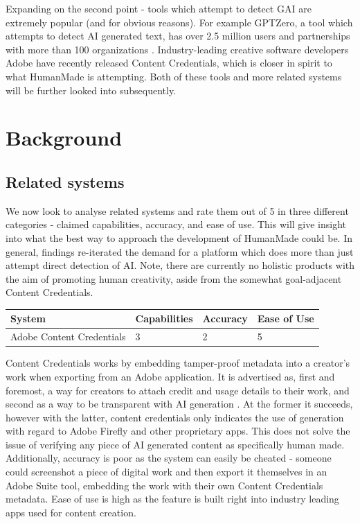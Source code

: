 \documentclass[12pt,a4paper]{article}
\begin{document}
\noindent Expanding on the second point - tools which attempt to detect GAI are extremely popular (and for obvious reasons). For example GPTZero, a tool which attempts to detect AI generated text, has over 2.5 million users and partnerships with more than 100 organizations \cite{gptzero}. Industry-leading creative software developers Adobe have recently released Content Credentials, which is closer in spirit to what HumanMade is attempting. Both of these tools and more related systems will be further looked into subsequently.
\section{Background}
\subsection{Related systems}
We now look to analyse related systems and rate them out of 5 in three different categories - claimed capabilities, accuracy, and ease of use. This will give insight into what the best way to approach the development of HumanMade could be. In general, findings re-iterated the demand for a platform which does more than just attempt direct detection of AI. Note, there are currently no holistic products with the aim of promoting human creativity, aside from the somewhat goal-adjacent Content Credentials.
\begin{table}[h]
    \centering
    \begin{tabular}{|M{3cm}|M{3cm}|M{3cm}|M{3cm}|}
    \hline
    System & Capabilities & Accuracy & Ease of Use \\ \hline 
    Adobe Content Credentials & 3 & 2 & 5\\
                           
\end{tabular}
\end{table}

\noindent Content Credentials works by embedding tamper-proof metadata into a creator's work when exporting from an Adobe application. It is advertised as, first and foremost, a way for creators to attach credit and usage details to their work, and second as a way to be transparent with AI generation \cite{adobe} . At the former it succeeds, however with the latter, content credentials only indicates the use of generation with regard to Adobe Firefly and other proprietary apps. This does not solve the issue of verifying any piece of AI generated content as specifically human made. Additionally, accuracy is poor as the system can easily be cheated - someone could screenshot a piece of digital work and then export it themselves in an Adobe Suite tool, embedding the work with their own Content Credentials metadata. Ease of use is high as the feature is built right into industry leading apps used for content creation.
\end{document}
